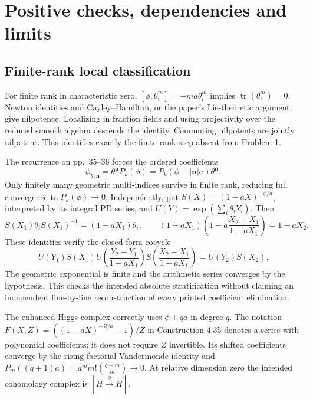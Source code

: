 \documentclass[10pt]{article}
\begin{document}
\section*{Positive checks, dependencies and limits}
\subsection*{Finite-rank local classification}
For finite rank in characteristic zero, \([\phi,\theta_i^m]=-ma\theta_i^m\) implies \(\operatorname{tr}(\theta_i^m)=0\). Newton identities and Cayley–Hamilton, or the paper’s Lie-theoretic argument, give nilpotence. Localizing in fraction fields and using projectivity over the reduced smooth algebra descends the identity. Commuting nilpotents are jointly nilpotent. This identifies exactly the finite-rank step absent from Problem 1.\par
The recurrence on pp. 35–36 forces the ordered coefficients \[\phi_{k,\mathbf n}=\theta^{\mathbf n}P_k(\phi)
                 =P_k(\phi+|\mathbf n|a)\theta^{\mathbf n}.
 \tag{3.1}\] Only finitely many geometric multi-indices survive in finite rank, reducing full convergence to \(P_k(\phi)\to0\). Independently, put \(S(X)=(1-aX)^{-\phi/a}\), interpreted by its integral PD series, and \(U(Y)=\exp(\sum_i\theta_iY_i)\). Then \[S(X_1)\theta_iS(X_1)^{-1}=(1-aX_1)\theta_i,\qquad
 (1-aX_1)\left(1-a\frac{X_2-X_1}{1-aX_1}\right)=1-aX_2.\] These identities verify the closed-form cocycle \[U(Y_1)S(X_1)
 U\!\left(\frac{Y_2-Y_1}{1-aX_1}\right)
 S\!\left(\frac{X_2-X_1}{1-aX_1}\right)=U(Y_2)S(X_2).
 \tag{3.2}\] The geometric exponential is finite and the arithmetic series converges by the hypothesis. This checks the intended absolute stratification without claiming an independent line-by-line reconstruction of every printed coefficient elimination.\par
The enhanced Higgs complex correctly uses \(\phi+qa\) in degree \(q\). The notation \(F(X,Z)=((1-aX)^{-Z/a}-1)/Z\) in Construction 4.35 denotes a series with polynomial coefficients; it does not require \(Z\) invertible. Its shifted coefficients converge by the rising-factorial Vandermonde identity and \(P_m((q+1)a)=a^m m!\binom{q+m}{m}\to0\). At relative dimension zero the intended cohomology complex is \([H\xrightarrow{\phi}H]\).\par
\end{document}
